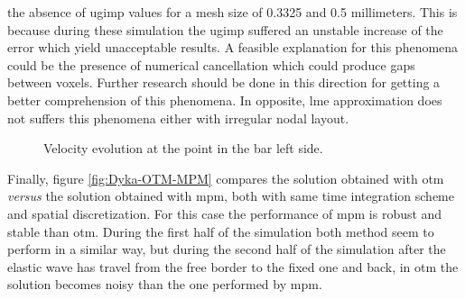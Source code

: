 \documentclass[preprint,12pt,a4paper]{elsarticle}
\begin{document}
the absence of \acrshort{ugimp} values for a mesh size of 0.3325 and 0.5
millimeters. This is because during these simulation the \acrshort{ugimp} suffered an unstable
increase of the error which yield unacceptable results. A feasible
explanation for this phenomena could be the presence of numerical
cancellation which could produce gaps between voxels. Further research
should be done in this direction for getting a better comprehension of
this phenomena. In opposite, \acrshort{lme} approximation does not
suffers this phenomena either with irregular nodal layout.
\begin{figure}\sidecaption
  \centering
  \caption{Velocity evolution at the point in the bar left side.}
  \label{fig:Dyka-uGIMP-LME}
\end{figure}
Finally, figure \ref{fig:Dyka-OTM-MPM} compares the solution obtained
with \acrshort{otm}~\cite{Li2010} \textit{versus} the solution obtained with \acrshort{mpm},
both with same time integration scheme and spatial discretization. For
this case the performance of \acrshort{mpm} is robust and stable than
\acrshort{otm}. During the first half of the simulation both method 
seem to perform in a similar way, but during the second half of the
simulation after the elastic wave has travel from the free border to
the fixed one and back, in \acrshort{otm} the solution becomes noisy than the
one performed by \acrshort{mpm}.  
\end{document}
